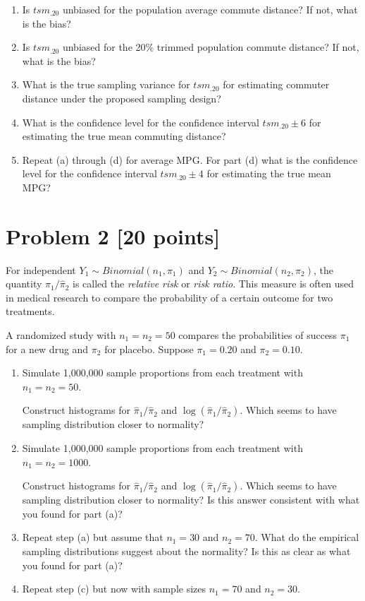 \documentclass[12pt]{article}
\begin{document}
\begin{enumerate}
\item[(a)] Is $tsm_{.20}$ unbiased for the population average commute distance? If not, what is the bias?
\item[(b)] Is $tsm_{.20}$ unbiased for the 20\% trimmed population commute distance? If not, what is the bias?
\item[(c)] What is the true sampling variance for $tsm_{.20}$ for estimating commuter distance under the proposed sampling design?
\item[(d)] What is the confidence level for the confidence interval $tsm_{.20} \pm 6$ for estimating the true mean commuting distance?
\item[(e)] Repeat (a) through (d) for average MPG. For part (d) what is the confidence level for the confidence interval $tsm_{.20} \pm 4$ for estimating the true mean MPG?
\end{enumerate}

\section*{Problem 2 [20 points]}

For independent $Y_1 \sim Binomial(n_1,\pi_1)$ and $Y_2 \sim Binomial(n_2,\pi_2)$, the quantity $\hat{\pi}_1/\hat{\pi}_2$ is called the \textit{relative risk} or \textit{risk ratio}. This measure is often used in medical research to compare the probability of a certain outcome for two treatments.

A randomized study with $n_1=n_2=50$ compares the probabilities of success $\pi_1$ for a new drug and $\pi_2$ for placebo. Suppose $\pi_1=0.20$ and $\pi_2=0.10$.

\begin{enumerate}
\item[(a)] Simulate 1,000,000 sample proportions from each treatment with $n_1=n_2=50$.

Construct histograms for $\hat{\pi}_1/\hat{\pi}_2$ and $\log(\hat{\pi}_1/\hat{\pi}_2)$. Which seems to have sampling distribution closer to normality?

\item[(b)] Simulate 1,000,000 sample proportions from each treatment with $n_1=n_2=1000$.

Construct histograms for $\hat{\pi}_1/\hat{\pi}_2$ and $\log(\hat{\pi}_1/\hat{\pi}_2)$. Which seems to have sampling distribution closer to normality? Is this answer consistent with what you found for part (a)?

\item[(c)] Repeat step (a) but assume that $n_1=30$ and $n_2=70$. What do the empirical sampling distributions suggest about the normality? Is this as clear as what you found for part (a)?

\item[(d)] Repeat step (c) but now with sample sizes $n_1=70$ and $n_2=30$.
\end{enumerate}
\end{document}
